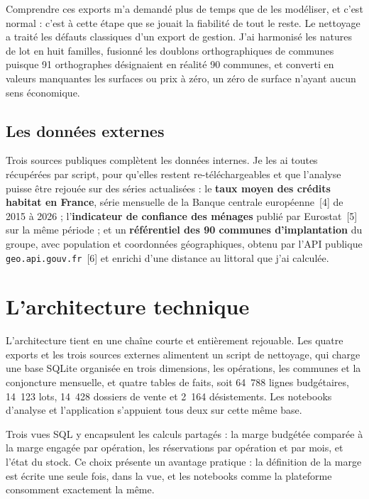 Comprendre ces exports m'a demandé plus de temps que de les modéliser, et c'est normal : c'est à
cette étape que se jouait la fiabilité de tout le reste. Le nettoyage a traité les défauts
classiques d'un export de gestion. J'ai harmonisé les natures de lot en huit familles, fusionné
les doublons orthographiques de communes puisque 91 orthographes désignaient en réalité 90
communes, et converti en valeurs manquantes les surfaces ou prix à zéro, un zéro de surface
n'ayant aucun sens économique.

\subsection{Les données externes}

Trois sources publiques complètent les données internes. Je les ai toutes récupérées par script,
pour qu'elles restent re-téléchargeables et que l'analyse puisse être rejouée sur des séries
actualisées : le \textbf{taux moyen des crédits habitat en France}, série mensuelle de la Banque
centrale européenne~[4] de 2015 à 2026 ; l'\textbf{indicateur de confiance des ménages} publié
par Eurostat~[5] sur la même période ; et un \textbf{référentiel des 90 communes d'implantation}
du groupe, avec population et coordonnées géographiques, obtenu par l'API publique
\texttt{geo.api.gouv.fr}~[6] et enrichi d'une distance au littoral que j'ai calculée.

\section{L'architecture technique}

L'architecture tient en une chaîne courte et entièrement rejouable. Les quatre exports et les
trois sources externes alimentent un script de nettoyage, qui charge une base SQLite organisée
en trois dimensions, les opérations, les communes et la conjoncture mensuelle, et quatre tables
de faits, soit 64~788 lignes budgétaires, 14~123 lots, 14~428 dossiers de vente et 2~164
désistements. Les notebooks d'analyse et l'application s'appuient tous deux sur cette même base.

Trois vues SQL y encapsulent les calculs partagés : la marge budgétée comparée à la marge
engagée par opération, les réservations par opération et par mois, et l'état du stock. Ce choix
présente un avantage pratique : la définition de la marge est écrite une seule fois, dans la
vue, et les notebooks comme la plateforme consomment exactement la même.

